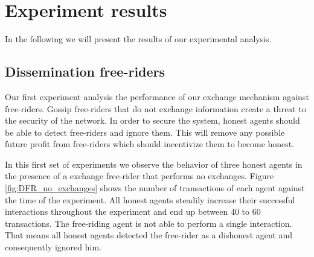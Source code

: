 \section{Experiment results}
In the following we will present the results of our experimental analysis.
\subsection{Dissemination free-riders}


Our first experiment analysis the performance of our exchange mechanism against free-riders. Gossip
free-riders that do not exchange information create a threat to the security of the network. In order
to secure the system, honest agents should be able to detect free-riders and ignore them. This will 
remove any possible future profit from free-riders which should incentivize them to become honest.

In this first set of experiments we observe the behavior of three honest agents in the presence of 
a exchange free-rider that performs no exchanges. Figure \ref{fig:DFR_no_exchanges} shows the number of transactions of each 
agent against the time of the experiment. All honest agents steadily increase their successful 
interactions throughout the experiment and end up between 40 to 60 transactions. The free-riding agent
is not able to perform a single interaction. That means all honest agents detected the free-rider 
as a dishonest agent and consequently ignored him. 

